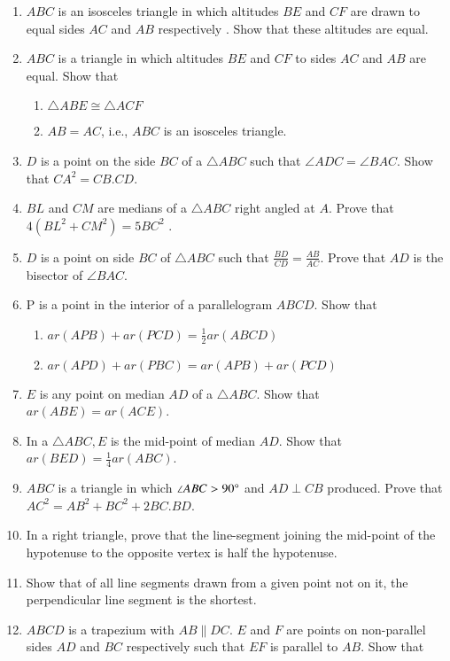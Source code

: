 \begin{enumerate}[label=\thesubsection.\arabic*.,ref=\thesubsection.\theenumi]

\item $ABC$ is an isosceles triangle in which altitudes $BE$ and $CF$ are drawn to equal sides $AC$ and $AB$ respectively . Show that these altitudes are equal.
%
\item $ABC$ is a triangle in which altitudes $BE$ and $CF$ to sides $AC$ and $AB$ are equal. Show that
%
\begin{enumerate} 
\item $\triangle  ABE \cong  \triangle  ACF $
\item  $AB = AC$, i.e., $ABC$ is an isosceles triangle.
\end{enumerate}
%
\item  $D$ is a point on the side $BC$ of a $\triangle ABC$ such that  $\angle  ADC =  \angle  BAC$. Show that $CA^2 = CB.CD$.
%
\item $BL$ and $CM$ are medians of a $\triangle ABC$ right angled at $A$. Prove that $4 (BL^2 + CM^2
) = 5 BC^2$ .
\item   $D$ is a point on side $BC$ of  $\triangle  ABC$ such that
$\frac{BD}{CD}= \frac{AB}{AC}  $.  Prove that $AD$ is the bisector of  $\angle  BAC$.
\item P is a point in the interior of a parallelogram $ABCD$. Show that
\begin{enumerate}
\item $ar (APB) + ar (PCD) = \frac{1}{ 2}ar (ABCD)$
\item $ar (APD) + ar (PBC) = ar (APB) + ar (PCD)$
\end{enumerate}
%
\item $E$ is any point on median $AD$ of a  $\triangle  ABC$. Show that $ar (ABE) = ar (ACE)$.
\item  In a $\triangle ABC, E$ is the mid-point of median $AD$. Show that $ar (BED) = \frac{1}{ 4}ar(ABC)$.
%
\item  $ABC$ is a triangle in which  $\angle  ABC > 90\degree$ and $AD  \perp  CB$ produced. Prove that
$ AC^2= AB^2 + BC^2 + 2 BC . BD$.
\item In a right triangle, prove that the line-segment joining the mid-point of the hypotenuse to the opposite vertex is half the hypotenuse.
\item Show that of all line segments drawn from a given point not on it, the perpendicular line segment is the shortest.
\item $ABCD$ is a trapezium with $AB  \parallel  DC$. $E$ and $F$ are points on non-parallel sides $AD$ and $BC$ respectively such that $EF$ is parallel to $AB$. Show that

\end{enumerate}
